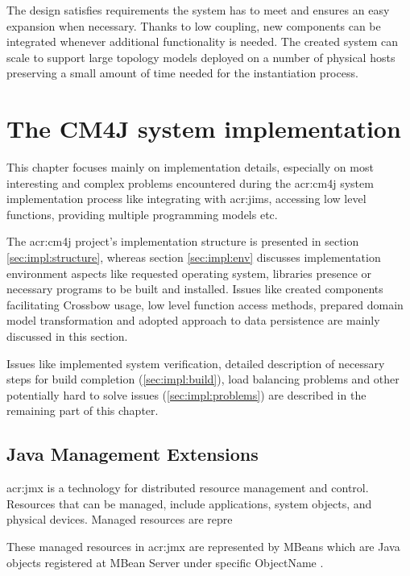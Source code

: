 \documentclass[11pt,openany]{book}
\begin{document}
      The design satisfies requirements the system has to meet and ensures an easy expansion when necessary. Thanks to
      low coupling, new components can be integrated whenever additional functionality is needed. The created system can
      scale to support large topology models deployed on a number of physical hosts preserving a small amount of time
      needed for the instantiation process.


  \chapter{The CM4J system implementation}
  \label{chap:impl}

    This chapter focuses mainly on implementation details, especially on most interesting and complex problems
    encountered during the \gls{acr:cm4j} system implementation process like integrating with \gls{acr:jims}, accessing
    low level functions, providing multiple programming models etc.

    The \gls{acr:cm4j} project's implementation structure is presented in section \ref{sec:impl:structure}, whereas
    section \ref{sec:impl:env} discusses implementation environment aspects like requested operating system, libraries
    presence or necessary programs to be built and installed. Issues like created components facilitating Crossbow
    usage, low level function access methods, prepared domain model transformation and adopted approach to data
    persistence are mainly discussed in this section.

    Issues like implemented system verification, detailed description of necessary steps for build completion
    (\ref{sec:impl:build}), load balancing problems and other potentially hard to solve issues (\ref{sec:impl:problems})
    are described in the remaining part of this chapter.


    \section{Java Management Extensions}

      \gls{acr:jmx} is a technology for distributed resource management and control. Resources that can be managed,
      include applications, system objects, and physical devices. Managed resources are repre
      
      
      
      These managed resources in \gls{acr:jmx} are represented by MBeans which are Java objects registered at MBean
      Server under specific ObjectName \cite{jims}.
\end{document}
